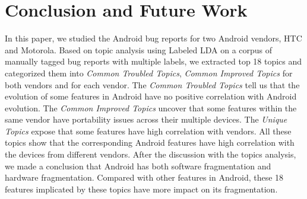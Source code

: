 \documentclass[10pt, conference, compsocconf]{IEEEtran}
\begin{document}
\section{Conclusion and Future Work}

In this paper, we studied the Android bug reports for two Android vendors, HTC and Motorola. Based on topic analysis using Labeled LDA on a corpus of manually tagged bug reports with multiple labels, we extracted top 18 topics and categorized them into \textit{Common Troubled Topics}, \textit{Common Improved Topics} for both vendors and  for each vendor. The \textit{Common Troubled Topics} tell us that the evolution of some features in Android have no positive correlation with Android evolution. The \textit{Common Improved Topics} uncover that some features within the same vendor have portability issues across their multiple devices. The \textit{Unique Topics} expose that some features have high correlation with vendors. All these topics show that the corresponding Android features have high correlation with the devices from different vendors. After the discussion with the topics analysis, we made a conclusion that Android has both software fragmentation and hardware fragmentation. Compared with other features in Android, these 18 features implicated by these topics have more impact on its fragmentation.




%
%
%
\end{document}
